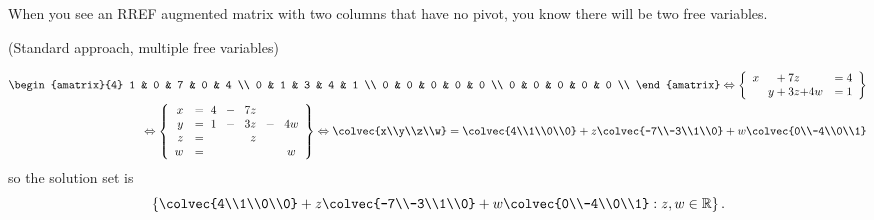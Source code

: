 When you see an RREF augmented matrix with two columns that have no pivot, you know there will be two free variables. 

\begin{example}{(Standard approach, multiple free variables)}

 \begin{eqnarray*}
 \begin{amatrix}{4} 
1 & 0 & 7 & 0 & 4 \\ 
0 & 1 & 3 & 4 & 1 \\ 
0 & 0 & 0 & 0 & 0 \\ 
0 & 0 & 0 & 0 & 0 \\ 
\end{amatrix}
\Leftrightarrow
\left\{
\begin{array}{lcr}
	x \phantom{+y}    + 7z  \phantom{+w} & = 4 \\
	\phantom {x+}   y + 3z  {+4w} & = 1 \\
     \end{array}
     \right\}
%
\\
\Leftrightarrow 
\left\{
\begin{array}{rlcrccrr}
	x & = \ 4&\! -\!&7z& \\
	 y  & = \ 1& \!-\!&3z&\!-\!&4w\\
	 z   & = &&z\\
	w & =&&&&w          
     \end{array}
     \right\}
     \Leftrightarrow
\colvec{x\\y\\z\\w} = \colvec{4\\1\\0\\0} + z\colvec{-7\\-3\\1\\0} + w\colvec{0\\-4\\0\\1}
\end{eqnarray*}
so the solution set is 
\[  \left\{  \colvec{4\\1\\0\\0} + z\colvec{-7\\-3\\1\\0} + w\colvec{0\\-4\\0\\1} : z,w\in \mathbb{R} \right\}. \]
\end{example}

